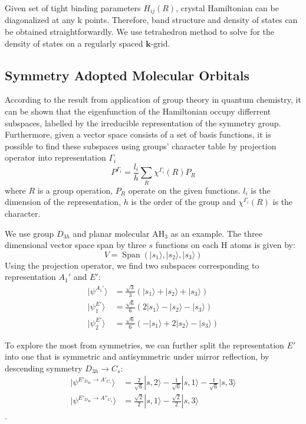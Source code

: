 \documentclass{article}
\DeclareMathOperator{\spn}{Span}
\begin{document}
Given set of tight binding parameters $H_{ij}(R)$, crystal Hamiltonian can be diagonalized at any k points. Therefore, 
band structure and density of states can be obtained straightforwardly. We use tetrahedron method to solve for 
the density of states on a regularly spaced $\mathbf{k}$-grid. 

\subsection{Symmetry Adopted Molecular Orbitals}
According to the result from application of group theory in quantum chemistry, it can be 
shown that the eigenfunction of the Hamiltonian occupy differrent subspaces, labelled by the 
irreducible representation of the symmetry group. Furthermore, given a vector space consists 
of a set of basis functions, it is possible to find these subspaces using groups' character table
by projection operator into representation $\Gamma_i$
\begin{equation}
    P^{\Gamma_i} = \frac{l_i}{h} \sum_R \chi^{\Gamma_i}(R) P_R
\end{equation}
where $R$ is a group operation, $P_R$ operate on the given functions. 
$l_i$ is the dimension of the representation, $h$ is the order of the group and
$\chi^{\Gamma_i}(R)$ is the character. 

We use group $D_{3h}$ and planar molecular AH$_3$ as an example. The 
three dimensional vector space span by three $s$ functions on each H atoms
is given by:
\begin{equation}
    V = \spn(|s_1\rangle, |s_2\rangle, |s_3\rangle)
\end{equation}
Using the projection operator, we find two subspaces corresponding to representation $A_1'$ 
and $E'$:
\begin{align}
    | \psi^{A_1'} \rangle &= \frac{\sqrt{3}}{3} (|s_1\rangle + |s_2\rangle + |s_3\rangle) \\
    |\psi_1^{E'}\rangle   &= \frac{\sqrt{6}}{6}( 2|s_1\rangle - |s_2\rangle - |s_3\rangle) \\
    |\psi_2^{E'}\rangle   &= \frac{\sqrt{6}}{6}(- |s_1\rangle + 2|s_2\rangle - |s_3\rangle)
\end{align}

To explore the most from symmetries, we can further split the representation $E'$ into one
that is symmetric and antisymmetric under mirror reflection, by descending symmetry $D_{3h}\to C_s$:
\begin{align}
    |\psi^{E'_{D_{3h}}\to A'_{C_s}} \rangle &= \frac{2}{\sqrt{6}} |s,2\rangle - \frac{1}{\sqrt{6}} |s,1\rangle - \frac{1}{\sqrt{6}} |s,3\rangle \\
    |\psi^{E'_{D_{3h}}\to A''_{C_s}}\rangle &= \frac{\sqrt{2}}{2} |s,1\rangle - \frac{\sqrt{2}}{2} |s,3\rangle
\end{align}.
\end{document}
